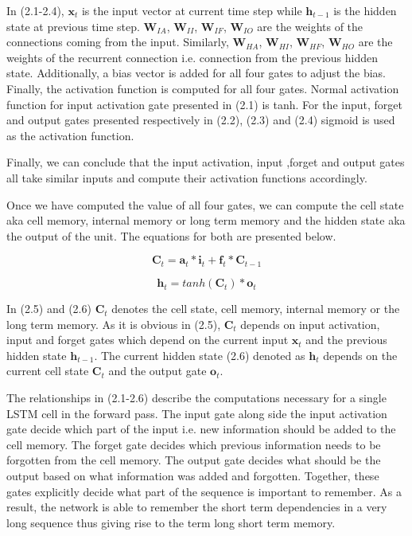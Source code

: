 In (2.1-2.4), $\textbf{x}_{t}$ is the input vector at current time step while $\textbf{h}_{t-1}$ is the hidden state at previous time step. $\textbf{W}_{IA}$, $\textbf{W}_{II}$, $\textbf{W}_{IF}$, 
$\textbf{W}_{IO}$ are the weights of the connections coming from the input. Similarly, $\textbf{W}_{HA}$, 
$\textbf{W}_{HI}$, $\textbf{W}_{HF}$, $\textbf{W}_{HO}$ are the weights of the recurrent connection i.e. connection from the previous hidden state. Additionally, a bias vector is added for all four gates to adjust the bias. Finally, the activation function is computed for all four gates. Normal activation function for input activation gate presented in (2.1) is tanh. For the input, forget and output gates presented respectively in (2.2), (2.3) and (2.4) sigmoid is used as the activation function. 

Finally, we can conclude that the input activation, input ,forget and output gates all take similar inputs and compute their activation functions accordingly. 

Once we have computed the value of all four gates, we can compute the cell state aka cell memory,  internal memory or long term memory and the hidden state aka the output of the unit. The equations for both are presented below.

\begin{equation}
\textbf{C}_t = \textbf{a}_t * \textbf{i}_t + \textbf{f}_t * \textbf{C}_{t-1}
\end{equation}

\begin{equation}
\textbf{h}_t =  tanh(\textbf{C}_{t}) * \textbf{o}_t
\end{equation}

In (2.5) and (2.6) $\textbf{C}_t$ denotes the cell state, cell memory, internal memory or the long term memory. As it is obvious in (2.5), $\textbf{C}_t$ depends on input activation, input and forget gates which depend on the current input $\textbf{x}_{t}$ and the previous hidden state $\textbf{h}_{t-1}$. The current hidden state (2.6) denoted as $\textbf{h}_t$ depends on the current cell state $\textbf{C}_t$ and the output gate $\textbf{o}_t$.   
 
The relationships in (2.1-2.6) describe the computations necessary for a single LSTM cell in the forward pass. The input gate along side the input activation gate decide which part of the input i.e. new information should be added to the cell memory. The forget gate decides which previous information needs to be forgotten from the cell memory. The output gate decides what should be the output based on what information was added and forgotten. Together, these gates explicitly decide what part of the sequence is important to remember. As a result, the network is able to remember the short term dependencies in a very long sequence thus giving rise to the term long short term memory.

